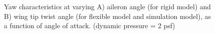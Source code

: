 \documentclass[11pt]{ucthesis}
\begin{document}
\begin{figure}[thpb]
\hfill
{}
\hfill
{}
\hfill
\caption{Yaw characteristics at varying A) aileron angle (for rigid model) and B) wing tip twist angle (for flexible model and simulation model), as a function of angle of attack. (dynamic pressure = 2 psf)}
\label{fig:Q2Yaw}
\end{figure}
\end{document}
